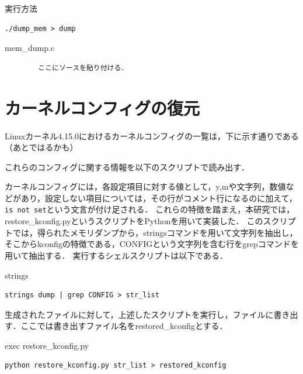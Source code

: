 
\begin{itembox}[l]{実行方法}
    \begin{verbatim}
./dump_mem > dump
    \end{verbatim}
\end{itembox}

\begin{itembox}[l]{mem_dump.c}
    \begin{verbatim}
        ここにソースを貼り付ける．
    \end{verbatim}
\end{itembox}

\section{カーネルコンフィグの復元}
\label{section:restore_kconfig}

Linuxカーネル4.15.0におけるカーネルコンフィグの一覧は，下に示す通りである（あとではるかも）

これらのコンフィグに関する情報を以下のスクリプトで読み出す．

カーネルコンフィグには，各設定項目に対する値として，y,mや文字列，数値などがあり，設定しない項目については，その行がコメント行になるのに加えて，\verb|is not set|という文言が付け足される．
これらの特徴を踏まえ，本研究では，restore_kconfig.pyというスクリプトをPythonを用いて実装した．
このスクリプトでは，得られたメモリダンプから，stringsコマンドを用いて文字列を抽出し，そこからkconfigの特徴である，CONFIGという文字列を含む行をgrepコマンドを用いて抽出する．
実行するシェルスクリプトは以下である．

\begin{itembox}[l]{strings}
    \begin{verbatim}
strings dump | grep CONFIG > str_list
    \end{verbatim}
\end{itembox}

生成されたファイルに対して，上述したスクリプトを実行し，ファイルに書き出す．ここでは書き出すファイル名をrestored_kconfigとする．

\begin{itembox}[l]{exec restore_kconfig.py}
    \begin{verbatim}
python restore_kconfig.py str_list > restored_kconfig
    \end{verbatim}
\end{itembox}

